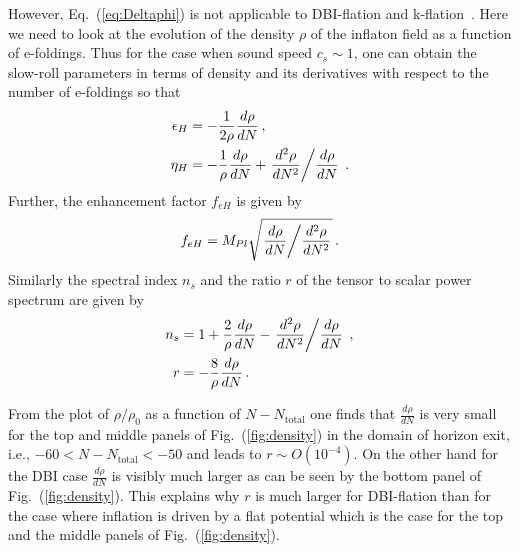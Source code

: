 \documentclass[12pt]{article}
\begin{document}
However, Eq.~(\ref{eq:Deltaphi}) is not applicable to DBI-flation and k-flation~\cite{Garriga:1999vw}.
Here we need to look at the evolution of the density $\rho$ of the inflaton field as a function of e-foldings.
Thus for the case when sound speed $c_s \sim 1$, one can obtain the slow-roll parameters in terms of density and its derivatives with respect to the number of e-foldings so that
\begin{equation}
  \begin{aligned}
    \epsilon_H &= -\frac{1}{2 \rho} \frac{d\rho}{dN}\,,\\
    \eta_H &= -\frac{1}{\rho} \frac{d\rho}{dN} + \left.\frac{d^2\rho}{dN^2} \middle/ \frac{d\rho}{dN}\right.\,.
  \end{aligned}
\end{equation}
Further, the enhancement factor $f_{eH}$ is given by
\begin{equation}
  f_{eH} = M_{Pl} \sqrt{\left.\frac{d\rho}{dN} \middle/ \frac{d^2\rho}{dN^2}\right.}\,.
\end{equation}
Similarly the spectral index $n_s$ and the ratio $r$ of the tensor to scalar power spectrum are given by
\begin{equation} \label{eq:rFromDDensityDN}
  \begin{aligned}
    n_s &= 1 + \frac{2}{\rho} \frac{d\rho}{dN} - \left.\frac{d^2\rho}{dN^2} \middle/ \frac{d\rho}{dN}\right.\,,\\
    r &= - \frac{8}{\rho} \frac{d\rho}{dN}\,.
  \end{aligned}
\end{equation}

From the plot of $\rho / \rho_0$ as a function of $N - N_{\text{total}}$ one finds that $\frac{d\rho}{dN}$ is very small for the top and middle panels of Fig.~(\ref{fig:density}) in the domain of horizon exit, i.e., $-60 < N - N_\text{total} < -50$ and leads to $r \sim O\left(10^{-4}\right)$.
On the other hand for the DBI case $\frac{d\rho}{dN}$ is visibly much larger as can be seen by the bottom panel of Fig.~(\ref{fig:density}).
This explains why $r$ is much larger for DBI-flation than for the case where inflation is driven by a flat potential which is the case for the top and the middle panels of Fig.~(\ref{fig:density}).
\end{document}
